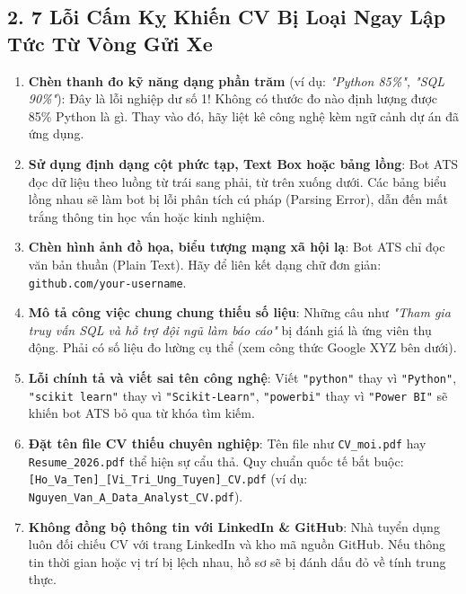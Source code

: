 \subsection{2. 7 Lỗi Cấm Kỵ Khiến CV Bị Loại Ngay Lập Tức Từ Vòng Gửi Xe}
\begin{enumerate}
    \item \textbf{Chèn thanh đo kỹ năng dạng phần trăm} (ví dụ: \textit{"Python 85\%", "SQL 90\%"}): Đây là lỗi nghiệp dư số 1! Không có thước đo nào định lượng được 85\% Python là gì. Thay vào đó, hãy liệt kê công nghệ kèm ngữ cảnh dự án đã ứng dụng.
    \item \textbf{Sử dụng định dạng cột phức tạp, Text Box hoặc bảng lồng}: Bot ATS đọc dữ liệu theo luồng từ trái sang phải, từ trên xuống dưới. Các bảng biểu lồng nhau sẽ làm bot bị lỗi phân tích cú pháp (Parsing Error), dẫn đến mất trắng thông tin học vấn hoặc kinh nghiệm.
    \item \textbf{Chèn hình ảnh đồ họa, biểu tượng mạng xã hội lạ}: Bot ATS chỉ đọc văn bản thuần (Plain Text). Hãy để liên kết dạng chữ đơn giản: \texttt{github.com/your-username}.
    \item \textbf{Mô tả công việc chung chung thiếu số liệu}: Những câu như \textit{"Tham gia truy vấn SQL và hỗ trợ đội ngũ làm báo cáo"} bị đánh giá là ứng viên thụ động. Phải có số liệu đo lường cụ thể (xem công thức Google XYZ bên dưới).
    \item \textbf{Lỗi chính tả và viết sai tên công nghệ}: Viết \texttt{"python"} thay vì \texttt{"Python"}, \texttt{"scikit learn"} thay vì \texttt{"Scikit-Learn"}, \texttt{"powerbi"} thay vì \texttt{"Power BI"} sẽ khiến bot ATS bỏ qua từ khóa tìm kiếm.
    \item \textbf{Đặt tên file CV thiếu chuyên nghiệp}: Tên file như \texttt{CV\_moi.pdf} hay \texttt{Resume\_2026.pdf} thể hiện sự cẩu thả. Quy chuẩn quốc tế bắt buộc: \texttt{[Ho\_Va\_Ten]\_[Vi\_Tri\_Ung\_Tuyen]\_CV.pdf} (ví dụ: \texttt{Nguyen\_Van\_A\_Data\_Analyst\_CV.pdf}).
    \item \textbf{Không đồng bộ thông tin với LinkedIn \& GitHub}: Nhà tuyển dụng luôn đối chiếu CV với trang LinkedIn và kho mã nguồn GitHub. Nếu thông tin thời gian hoặc vị trí bị lệch nhau, hồ sơ sẽ bị đánh dấu đỏ về tính trung thực.
\end{enumerate}

